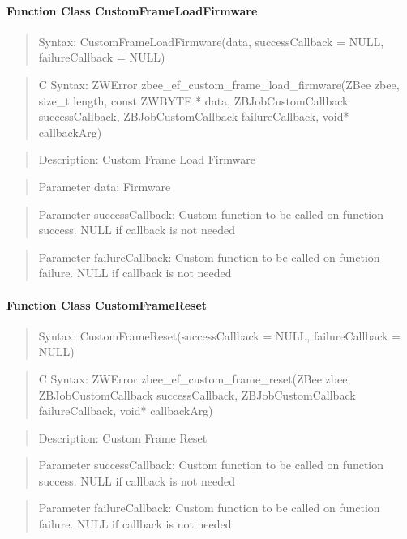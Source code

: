 \paragraph{Function Class CustomFrameLoadFirmware}
\begin{quote}Syntax: CustomFrameLoadFirmware(data, successCallback = NULL, failureCallback = NULL)\end{quote}
\begin{quote}C Syntax: ZWError zbee\_ef\_custom\_frame\_load\_firmware(ZBee zbee, size\_t length, const ZWBYTE * data, ZBJobCustomCallback successCallback, ZBJobCustomCallback failureCallback, void* callbackArg)\end{quote}
\begin{quote}Description: Custom Frame Load Firmware\end{quote}
\begin{quote}Parameter data: Firmware\end{quote}
\begin{quote}Parameter successCallback: Custom function to be called on function success. NULL if callback is not needed\end{quote}
\begin{quote}Parameter failureCallback: Custom function to be called on function failure. NULL if callback is not needed\end{quote}


\paragraph{Function Class CustomFrameReset}
\begin{quote}Syntax: CustomFrameReset(successCallback = NULL, failureCallback = NULL)\end{quote}
\begin{quote}C Syntax: ZWError zbee\_ef\_custom\_frame\_reset(ZBee zbee, ZBJobCustomCallback successCallback, ZBJobCustomCallback failureCallback, void* callbackArg)\end{quote}
\begin{quote}Description: Custom Frame Reset\end{quote}
\begin{quote}Parameter successCallback: Custom function to be called on function success. NULL if callback is not needed\end{quote}
\begin{quote}Parameter failureCallback: Custom function to be called on function failure. NULL if callback is not needed\end{quote}


